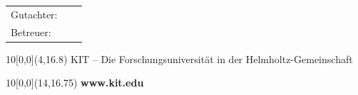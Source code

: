 \begin{titlepage}
{		\begin{center}
			\begin{tabular}[ht]{l c l}
				Gutachter: & \hfill & \reviewerone \\
				Betreuer:  & \hfill & \advisor     \\
			\end{tabular}
		\end{center}
	}

	\vspace{1cm}
	\begin{center}
		\large{\submissiontime} %
	\end{center}

	\begin{textblock}{10}[0,0](4,16.8)
		\tiny{
			KIT -- Die Forschungsuniversität in der Helmholtz-Gemeinschaft
		}
	\end{textblock}

	\begin{textblock}{10}[0,0](14,16.75)
		\large{
			\textbf{www.kit.edu}
		}
	\end{textblock}

\end{titlepage}
